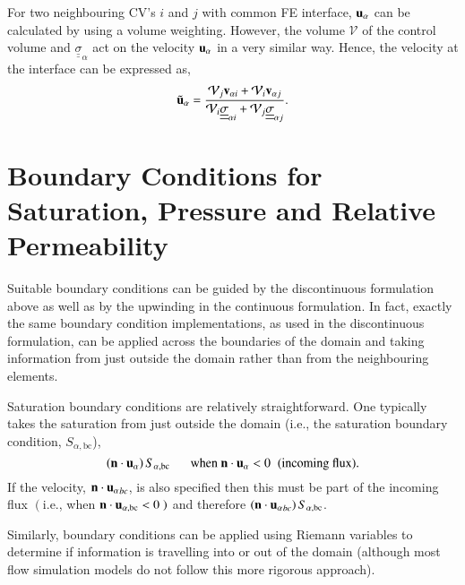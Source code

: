 \documentclass[preprint,authoryear,12pt]{elsarticle}
\newcommand{\frc}{\displaystyle\frac}
\begin{document}
For two neighbouring CV's $i$ and $j$ with common FE interface, ${\bf u}_{\alpha}$ can be calculated by using a volume weighting. However, the volume $\mathcal{V}$ of the control volume and $\underline{\underline{\sigma}}_{\alpha}$ act on the velocity ${\bf u}_{\alpha}$ in a very similar way. Hence, the velocity at the interface can be expressed as,
\begin{equation} 
  {\tilde{\bf u}_\alpha} = \frc{ \mathcal{V}_{j} {\bf v}_{\alpha i} + \mathcal{V}_{i} {\bf v}_{\alpha j}} { \mathcal{V}_{i} \underline{\underline{\sigma}}_{\alpha i} + \mathcal{V}_{j} \underline{\underline{\sigma}}_{\alpha j} }.
\end{equation} 

\section{Boundary Conditions for Saturation, Pressure and Relative Permeability}\label{bcs-rel-perm} 

Suitable boundary conditions can be guided by the discontinuous formulation above as well as by the upwinding in the continuous formulation. In fact, exactly the same boundary condition implementations, as used in the discontinuous formulation, can be applied across the boundaries of the domain and taking information from just outside the domain rather than from the neighbouring elements.

Saturation boundary conditions are relatively straightforward. One typically takes the saturation from just outside the domain (i.e., the saturation boundary condition, ${S_{\alpha, \text{bc}}}$),
\begin{displaymath}
\left({\bf n}\cdot {\bf u}_\alpha\right)S_{\alpha,\text{bc}}\;\;\;\;\;\text{ when } {\bf n}\cdot {\bf u}_{\alpha} < 0\;\;\text{(incoming flux)}.
\end{displaymath}
If the velocity, ${\bf n}\cdot {{\bf u}_\alpha}_{bc}$, is also specified then this must be part of the incoming flux $\left(\right.$i.e., when ${\bf n}\cdot {\bf u}_{\alpha,\text{bc}} < 0\left.\right)$ and therefore $\left({\bf n}\cdot {{\bf u}_\alpha}_{bc}\right)S_{\alpha,\text{bc}}$.

Similarly, boundary conditions can be applied using Riemann variables to determine if information is travelling into or out of the domain (although most flow simulation models do not follow this more rigorous approach).  
\end{document}
